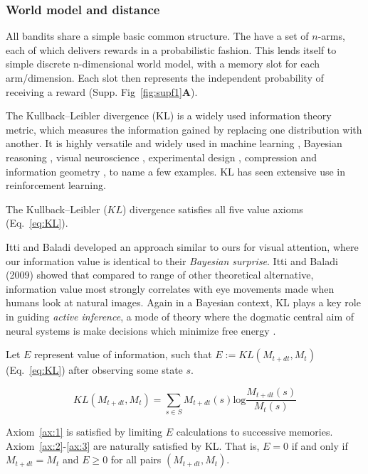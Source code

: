 \subsubsection*{World model and distance}
All bandits share a simple basic common structure. The have a set of $n$-arms, each of which delivers rewards in a probabilistic fashion. This lends itself to simple discrete n-dimensional world model, with a memory  slot for each arm/dimension. Each slot then represents the independent probability of receiving a reward (Supp. Fig~\ref{fig:supf1}\textbf{A}). 

The Kullback--Leibler divergence (KL) is a widely used information theory metric, which measures the information gained by replacing one distribution with another. It is highly versatile and widely used in machine learning \cite{Goodfellow-et-al-2016}, Bayesian reasoning \cite{Itti2009,Friston2016}, visual neuroscience \cite{Itti2009}, experimental design \cite{Lopez-Fidalgo2007}, compression \cite{Mackay,Still2012} and information geometry \cite{Ay2015}, to name a few examples. KL has seen extensive use in reinforcement learning. %

The Kullback--Leibler ($KL$) divergence satisfies all five value axioms (Eq.~\ref{eq:KL}). 

Itti and Baladi \citep{Itti2009} developed an approach similar to ours for visual attention, where our information value is identical to their \textit{Bayesian surprise}. Itti and Baladi (2009) showed that compared to range of other theoretical alternative, information value most strongly correlates with eye movements made when humans look at natural images. Again in a Bayesian context, KL plays a key role in guiding \textit{active inference}, a mode of theory where the dogmatic central aim of neural systems is make decisions which minimize free energy \cite{Friston2016,Schwartenbeck2019}. 

\begin{definition}
    Let $E$ represent value of information, such that $E := KL(M_{t+dt}, M_t)$ (Eq.~\ref{eq:KL}) after observing some state $s$.
\end{definition}

\begin{equation}
    KL(M_{t+dt}, M_t) = \sum_{s \in S} M_{t+dt}(s) \text{log} \frac{M_{t+dt}(s)}{M_t(s)} 
    \label{eq:KL}
\end{equation}

Axiom~\ref{ax:1} is satisfied by limiting $E$ calculations to successive memories. Axiom~\ref{ax:2}-\ref{ax:3} are naturally satisfied by KL. That is, $E = 0$ if and only if $M_{t+dt} = M_t$ and $E \geq 0$ for all pairs $(M_{t+dt}, M_t)$.

